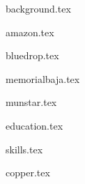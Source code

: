 \documentclass[11pt]{article}
\begin{document}
{background.tex}


{amazon.tex}

{bluedrop.tex}

{memorialbaja.tex}


{munstar.tex}




{education.tex}


{skills.tex}


{copper.tex}


\end{document}
